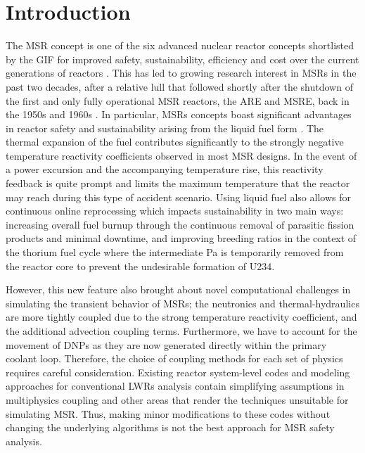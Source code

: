 \section{Introduction}

The \gls{MSR} concept is one of the six advanced nuclear reactor concepts
shortlisted by the \gls{GIF} for improved safety, sustainability, efficiency
and cost over the current generations of reactors
\cite{gif_technology_2002} \cite{gif_technology_2014}. This has led
to growing
research interest in \glspl{MSR} in the past two decades, after a relative
lull that followed shortly after the shutdown of the first and only fully
operational \gls{MSR} reactors, the \gls{ARE} and \gls{MSRE}, back in the
1950s and 1960s \cite{haubenreich_msre_1964}
\cite{haubenreich_experience_1970}. In particular, \glspl{MSR} concepts boast
significant advantages in reactor safety and sustainability arising from the
liquid fuel form \cite{elsheikh_safety_2013}. The thermal expansion of the
fuel contributes significantly to the
strongly negative temperature reactivity coefficients observed in most
\gls{MSR} designs. In the event of a power excursion and the accompanying
temperature rise, this reactivity feedback is quite prompt and limits the
maximum temperature that the reactor may reach during this type of accident
scenario. Using liquid fuel also allows for continuous online reprocessing
which impacts sustainability in two main ways: increasing overall fuel burnup
through the continuous removal of parasitic fission products and minimal
downtime, and improving breeding ratios in the context of the thorium fuel
cycle where the intermediate Pa is temporarily removed from the reactor core
to prevent the undesirable formation of U234.

However, this new feature also brought about novel computational
challenges in simulating the transient behavior of \glspl{MSR}; the
neutronics and thermal-hydraulics are more tightly coupled due to the strong
temperature reactivity coefficient, and the additional advection coupling
terms. Furthermore, we have to account for the movement of \glspl{DNP} as
they are now generated directly within the primary coolant loop. Therefore,
the choice of coupling methods for each set of physics requires careful
consideration. Existing reactor system-level codes and modeling approaches
for conventional \glspl{LWR} analysis contain simplifying assumptions in
multiphysics coupling and other areas that render the techniques unsuitable
for simulating \gls{MSR}. Thus, making minor modifications to these codes
without changing the underlying algorithms is not the best approach for
\gls{MSR} safety analysis.

